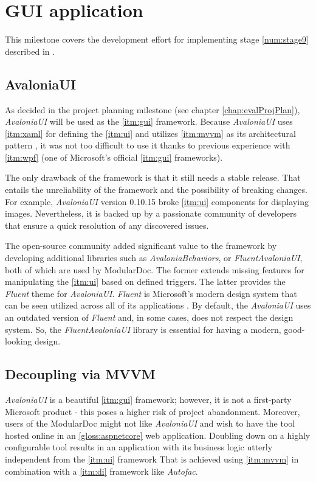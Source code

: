 \chapter{GUI application}

This milestone covers the development effort for implementing stage \ref{num:stage9} described in .

\section{AvaloniaUI}

As decided in the project planning milestone (see chapter \ref{chap:evalProjPlan}), \textit{AvaloniaUI} will be used as the \ref{itm:gui} framework.
Because \textit{AvaloniaUI} uses \ref{itm:xaml} for defining the \ref{itm:ui} and utilizes \ref{itm:mvvm} as its architectural pattern \cite{katz_mvvm_2022}, it was not too difficult to use it thanks to previous experience with \ref{itm:wpf} (one of Microsoft's official \ref{itm:gui} frameworks).

The only drawback of the framework is that it still needs a stable release. That entails the unreliability of the framework and the possibility of breaking changes. For example, \textit{AvaloniaUI} version 0.10.15 broke \ref{itm:ui} components for displaying images. Nevertheless, it is backed up by a passionate community of developers that ensure a quick resolution of any discovered issues.

The open-source community added significant value to the framework by developing additional libraries such as \textit{AvaloniaBehaviors}, or \textit{FluentAvaloniaUI}, both of which are used by ModularDoc. The former extends missing features for manipulating the \ref{itm:ui} based on defined triggers. The latter provides the \textit{Fluent} theme for \textit{AvaloniaUI}. \textit{Fluent} is Microsoft's modern design system that can be seen utilized across all of its applications \cite{microsoft_microsoft_nodate}. By default, the \textit{AvaloniaUI} uses an outdated version of \textit{Fluent} and, in some cases, does not respect the design system. So, the \textit{FluentAvaloniaUI} library is essential for having a modern, good-looking design.

\section{Decoupling via MVVM}

\textit{AvaloniaUI} is a beautiful \ref{itm:gui} framework; however, it is not a first-party Microsoft product - this poses a higher risk of project abandonment. Moreover, users of the ModularDoc might not like \textit{AvaloniaUI} and wish to have the tool hosted online in an \ref{gloss:aspnetcore} web application. Doubling down on a highly configurable tool results in an application with its business logic utterly independent from the \ref{itm:ui} framework
That is achieved using \ref{itm:mvvm} in combination with a \ref{itm:di} framework like \textit{Autofac}.

